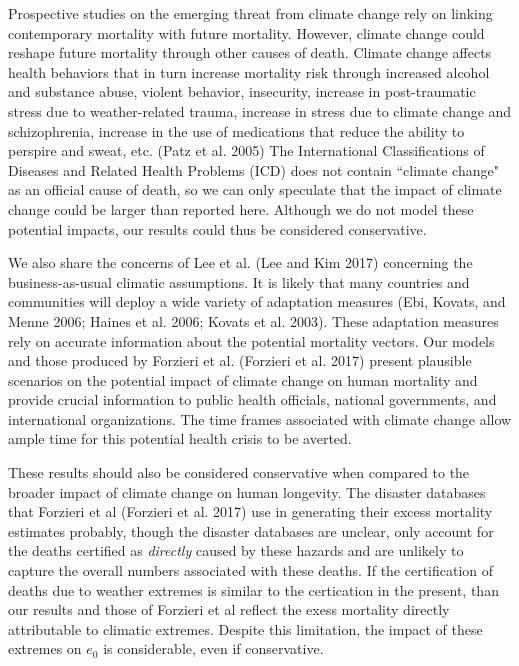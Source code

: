 \documentclass[12pt,]{article}
\begin{document}
Prospective studies on the emerging threat from climate change rely on
linking contemporary mortality with future mortality. However, climate
change could reshape future mortality through other causes of death.
Climate change affects health behaviors that in turn increase mortality
risk through increased alcohol and substance abuse, violent behavior,
insecurity, increase in post-traumatic stress due to weather-related
trauma, increase in stress due to climate change and schizophrenia,
increase in the use of medications that reduce the ability to perspire
and sweat, etc. (Patz et al. 2005) The International Classifications of
Diseases and Related Health Problems (ICD) does not contain ``climate
change" as an official cause of death, so we can only speculate that the
impact of climate change could be larger than reported here. Although we
do not model these potential impacts, our results could thus be
considered conservative.

We also share the concerns of Lee et al. (Lee and Kim 2017) concerning
the business-as-usual climatic assumptions. It is likely that many
countries and communities will deploy a wide variety of adaptation
measures (Ebi, Kovats, and Menne 2006; Haines et al. 2006; Kovats et al.
2003). These adaptation measures rely on accurate information about the
potential mortality vectors. Our models and those produced by Forzieri
et al. (Forzieri et al. 2017) present plausible scenarios on the
potential impact of climate change on human mortality and provide
crucial information to public health officials, national governments,
and international organizations. The time frames associated with climate
change allow ample time for this potential health crisis to be averted.

These results should also be considered conservative when compared to
the broader impact of climate change on human longevity. The disaster
databases that Forzieri et al (Forzieri et al. 2017) use in generating
their excess mortality estimates probably, though the disaster databases
are unclear, only account for the deaths certified as \emph{directly}
caused by these hazards and are unlikely to capture the overall numbers
associated with these deaths. If the certification of deaths due to
weather extremes is similar to the certication in the present, than our
results and those of Forzieri et al reflect the exess mortality directly
attributable to climatic extremes. Despite this limitation, the impact
of these extremes on \(e_0\) is considerable, even if conservative.
\end{document}
